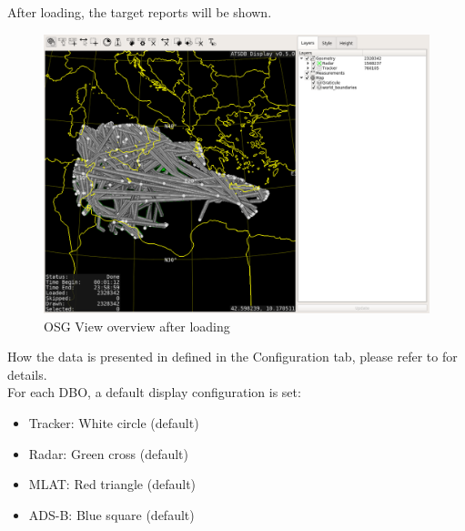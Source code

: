 After loading, the target reports will be shown.

\begin{figure}[H]
    \hspace*{-2.5cm}
    \includegraphics[width=19cm,frame]{../screenshots/osgview_overview_loaded.png}
  \caption{OSG View overview after loading}
\end{figure} 

How the data is presented in defined in the Configuration tab, please refer to  for details. \\

For each DBO, a default display configuration is set:

\begin{itemize}
 \item Tracker: White circle (default)
 \item Radar: Green cross (default)
 \item MLAT: Red triangle (default)
 \item ADS-B: Blue square (default)
\end{itemize}
